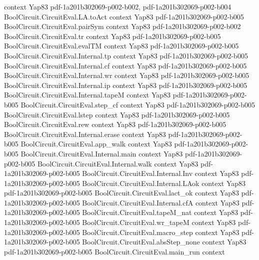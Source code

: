 \begin{theorem}
  {context}
  {Yap83}
  {pdf-1a201b302069-p002-b002,
    pdf-1a201b302069-p002-b004}
\proofstep
  {BoolCircuit.CircuitEval.LA.toAct}
  {context}
  {Yap83}
  {pdf-1a201b302069-p002-b005}
\proofstep
  {BoolCircuit.CircuitEval.pairSym}
  {context}
  {Yap83}
  {pdf-1a201b302069-p002-b002}
\proofstep
  {BoolCircuit.CircuitEval.tr}
  {context}
  {Yap83}
  {pdf-1a201b302069-p002-b005}
\proofstep
  {BoolCircuit.CircuitEval.evalTM}
  {context}
  {Yap83}
  {pdf-1a201b302069-p002-b005}
\proofstep
  {BoolCircuit.CircuitEval.Internal.tp}
  {context}
  {Yap83}
  {pdf-1a201b302069-p002-b005}
\proofstep
  {BoolCircuit.CircuitEval.Internal.cf}
  {context}
  {Yap83}
  {pdf-1a201b302069-p002-b005}
\proofstep
  {BoolCircuit.CircuitEval.Internal.wr}
  {context}
  {Yap83}
  {pdf-1a201b302069-p002-b005}
\proofstep
  {BoolCircuit.CircuitEval.Internal.ip}
  {context}
  {Yap83}
  {pdf-1a201b302069-p002-b005}
\proofstep
  {BoolCircuit.CircuitEval.Internal.tapeM}
  {context}
  {Yap83}
  {pdf-1a201b302069-p002-b005}
\proofstep
  {BoolCircuit.CircuitEval.step_cf}
  {context}
  {Yap83}
  {pdf-1a201b302069-p002-b005}
\proofstep
  {BoolCircuit.CircuitEval.lstep}
  {context}
  {Yap83}
  {pdf-1a201b302069-p002-b005}
\proofstep
  {BoolCircuit.CircuitEval.rew}
  {context}
  {Yap83}
  {pdf-1a201b302069-p002-b005}
\proofstep
  {BoolCircuit.CircuitEval.Internal.erase}
  {context}
  {Yap83}
  {pdf-1a201b302069-p002-b005}
\proofstep
  {BoolCircuit.CircuitEval.app_walk}
  {context}
  {Yap83}
  {pdf-1a201b302069-p002-b005}
\proofstep
  {BoolCircuit.CircuitEval.Internal.main}
  {context}
  {Yap83}
  {pdf-1a201b302069-p002-b005}
\proofstep
  {BoolCircuit.CircuitEval.Internal.walk}
  {context}
  {Yap83}
  {pdf-1a201b302069-p002-b005}
\proofstep
  {BoolCircuit.CircuitEval.Internal.Inv}
  {context}
  {Yap83}
  {pdf-1a201b302069-p002-b005}
\proofstep
  {BoolCircuit.CircuitEval.Internal.LAok}
  {context}
  {Yap83}
  {pdf-1a201b302069-p002-b005}
\proofstep
  {BoolCircuit.CircuitEval.lact_ok}
  {context}
  {Yap83}
  {pdf-1a201b302069-p002-b005}
\proofstep
  {BoolCircuit.CircuitEval.Internal.cfA}
  {context}
  {Yap83}
  {pdf-1a201b302069-p002-b005}
\proofstep
  {BoolCircuit.CircuitEval.tapeM_nat}
  {context}
  {Yap83}
  {pdf-1a201b302069-p002-b005}
\proofstep
  {BoolCircuit.CircuitEval.wr_tapeM}
  {context}
  {Yap83}
  {pdf-1a201b302069-p002-b005}
\proofstep
  {BoolCircuit.CircuitEval.macro_step}
  {context}
  {Yap83}
  {pdf-1a201b302069-p002-b005}
\proofstep
  {BoolCircuit.CircuitEval.absStep_none}
  {context}
  {Yap83}
  {pdf-1a201b302069-p002-b005}
\proofstep
  {BoolCircuit.CircuitEval.main_run}
  {context}

\end{theorem}
